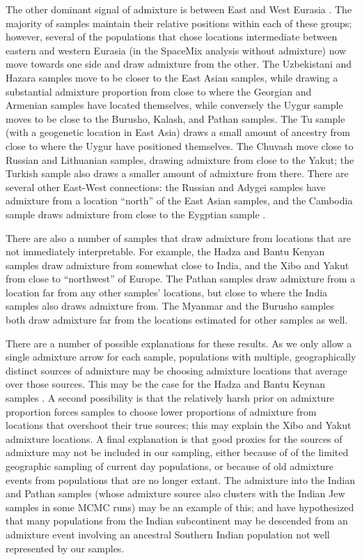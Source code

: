 \documentclass[12pt]{article}
\begin{document}
The other dominant signal of admixture is between East and West Eurasia \citep[a signal documented by many authors:][]{rosenberg_genetic_2002,li_worldwide_2008, xu_genome-wide_2008,Hellenthal}. The majority of samples maintain their relative positions within each of these groups; however, several of the populations that chose locations intermediate between eastern and western Eurasia (in the SpaceMix analysis without admixture) now move towards one side and draw admixture from the other.  The Uzbekistani and Hazara samples move to be closer to the East Asian samples, while drawing a substantial admixture proportion from close to where the Georgian and Armenian samples have located themselves, while conversely the Uygur sample moves to be close to the Burusho, Kalash, and Pathan samples. The Tu sample (with a geogenetic location in East Asia) draws a small amount of ancestry from close to where the Uygur have positioned themselves. The Chuvash move close to Russian and Lithuanian samples, drawing admixture from close to the Yakut; the Turkish sample also draws a smaller amount of admixture from there. There are several other East-West connections: the Russian and Adygei samples have admixture from a location ``north'' of the East Asian samples, and the Cambodia sample draws admixture from close to the Eygptian sample \citep{Treemix, Hellenthal}. 

There are also a number of samples that draw admixture from locations that are not immediately interpretable.  For example, the Hadza and Bantu Kenyan samples draw admixture from somewhat close to India, 
and the Xibo and Yakut from close to ``northwest'' of Europe.  
The Pathan samples draw admixture from a location far from any other samples' locations, but close to where the India samples also draws admixture from. 
The Myanmar and the Burusho samples both draw admixture far from the locations estimated for other samples as well.

There are a number of possible explanations for these results. As we only allow a single admixture arrow for each sample, populations with multiple, geographically distinct sources of admixture may be choosing admixture locations that average over those sources. This may be the case for the Hadza and Bantu Keynan samples \citep{Hellenthal}.  A second possibility is that the relatively harsh prior on admixture proportion forces samples to choose lower proportions of admixture from locations that overshoot their true sources; this may explain the Xibo and Yakut admixture locations. A final explanation is that good proxies for the sources of admixture may not be included in our sampling, either because of of the limited geographic sampling of current day populations, or because of old admixture events from populations that are no longer extant. The admixture into the Indian and Pathan samples (whose admixture source also clusters with the Indian Jew samples in some MCMC runs) may be an example of this; \citet{reich_india_2009} and \citet{moorjani_india_2013} have hypothesized that many populations from the Indian subcontinent may be descended from an admixture event involving an ancestral Southern Indian population not well represented by our samples. 
\end{document}
